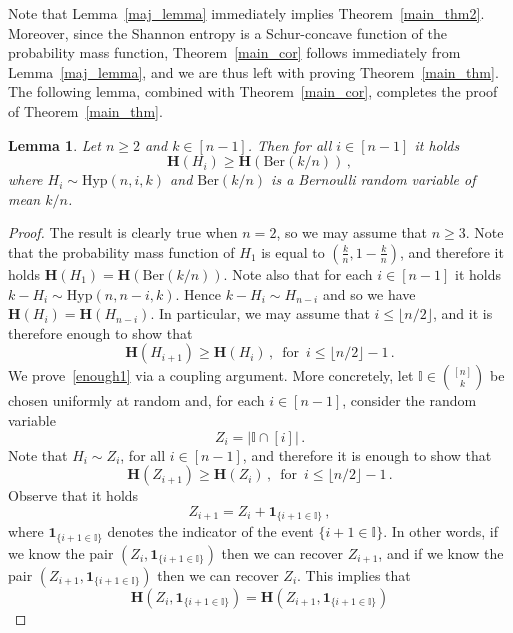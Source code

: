 \documentclass[11pt]{article}
\newtheorem{lemma}{Lemma}
\newcommand{\bh}{\mathbf{H}}
\begin{document}
Note that Lemma~\ref{maj_lemma} immediately implies Theorem~\ref{main_thm2}. Moreover, since the Shannon entropy is a Schur-concave function of the probability mass function, Theorem~\ref{main_cor}  follows immediately  from  Lemma~\ref{maj_lemma}, 
and we are thus left with proving Theorem~\ref{main_thm}. 
The following lemma, combined with Theorem~\ref{main_cor},  completes the proof of  Theorem~\ref{main_thm}. 

\begin{lemma}\label{last_lemma}
Let $n\ge 2$ and $k\in [n-1]$. Then for all $i\in [n-1]$ it holds 
\[
\bh(H_i) \ge \bh(\text{Ber}(k/n)) \, ,
\]
where $H_i\sim\text{Hyp}(n,i,k)$ and 
$\text{Ber}(k/n)$ is a Bernoulli random variable of mean $k/n$. 
\end{lemma}
\begin{proof} 
The result is clearly true when $n=2$, so we may assume that $n\ge 3$. 
Note that the probability mass function of $H_1$ is equal to $(\frac{k}{n}, 1 - \frac{k}{n})$, and therefore it holds 
$\bh(H_1)=\bh(\text{Ber}(k/n))$. 
Note also that  for each $i\in [n-1]$ it holds 
$k-H_i \sim\text{Hyp}(n,n-i,k)$. Hence $k-H_i \sim H_{n-i}$ and so we have $\bh(H_i) = \bh(H_{n-i})$. 
In particular, we may assume that $i\le \lfloor n/2\rfloor$, and it  is therefore  enough to show that 
\begin{equation}\label{enough1}
\bh(H_{i+1}) \ge \bh(H_i) \, , \, \text{ for } \, i \le \lfloor n/2\rfloor -1 \, .
\end{equation}
We prove~\eqref{enough1} via a coupling argument.  
More concretely, let $\mathbb{I}\in\binom{[n]}{k}$ be chosen uniformly at random and, for each $i\in [n-1]$, consider the random variable  
\[
Z_i = |\mathbb{I} \cap [i]| \, .
\]   
Note that $H_i \sim Z_i$, for all $i\in [n-1]$, and therefore it is enough to show that 
\begin{equation}\label{enough1.2}
\bh(Z_{i+1}) \ge \bh(Z_i) \, , \, \text{ for } \, i \le \lfloor n/2\rfloor -1 \, .
\end{equation}
Observe that it holds 
\[
Z_{i+1} = Z_i + \mathbf{1}_{\{i+1\in \mathbb{I}\}} \, ,
\]
where $\mathbf{1}_{\{i+1\in \mathbb{I}\}}$ denotes the indicator of the event $\{i+1\in \mathbb{I}\}$. 
In other words, if we know the pair $(Z_i, \mathbf{1}_{\{i+1\in \mathbb{I}\}})$ then we can recover $Z_{i+1}$, and if we know the pair 
$(Z_{i+1}, \mathbf{1}_{\{i+1\in \mathbb{I}\}})$ then we can recover $Z_i$. 
This implies that 
\[
\bh(Z_i, \mathbf{1}_{\{i+1\in \mathbb{I}\}}) = \bh(Z_{i+1}, \mathbf{1}_{\{i+1\in \mathbb{I}\}}) 
\]

\end{proof}
\end{document}

